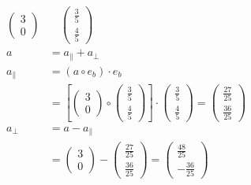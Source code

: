 \documentclass[a4paper]{article}
\begin{document}
  \subsection{}
    \begin{align*}
      \begin{pmatrix}
        3 \\ 0
      \end{pmatrix}
      &\quad
      \begin{pmatrix}
        \frac{3}{5} \\ \frac{4}{5}
      \end{pmatrix}
      \\[1em]
      a &= a_\parallel + a_\perp
      \\[1em]
      a_\parallel &= (a \circ e_b) \cdot e_b
      \\[1em]
      &= [
      \begin{pmatrix}
        3 \\ 0
      \end{pmatrix}
      \circ
      \begin{pmatrix}
        \frac{3}{5} \\ \frac{4}{5}
      \end{pmatrix}
      ] \cdot
      \begin{pmatrix}
        \frac{3}{5} \\ \frac{4}{5}
      \end{pmatrix}
      =
      \begin{pmatrix}
        \frac{27}{25} \\ \frac{36}{25}
      \end{pmatrix}
      \\[1em]
      a_\perp &= a - a_\parallel
      \\[1em]
      &=
      \begin{pmatrix}
        3 \\ 0
      \end{pmatrix}
      -
      \begin{pmatrix}
        \frac{27}{25} \\ \frac{36}{25}
      \end{pmatrix}
      =
      \begin{pmatrix}
        \frac{48}{25} \\ -\frac{36}{25}
      \end{pmatrix}
    \end{align*}
\end{document}
